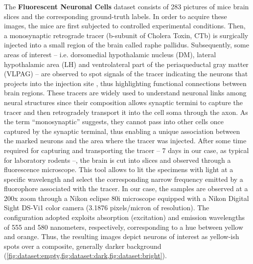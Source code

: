 The \textbf{Fluorescent Neuronal Cells} dataset \cite{clissa2021fluocells} consists of 283 
pictures 
of mice brain slices and the corresponding ground-truth labels.
In order to acquire these images, the mice are first subjected to controlled experimental conditions. Then, a monosynaptic retrograde tracer (b-subunit of Cholera Toxin, CTb) is surgically injected into a small region of the brain called raphe pallidus.
Subsequently, some areas of interest -- i.e. dorsomedial hypothalamic nucleus (DM), lateral hypothalamic area (LH) and ventrolateral part of the periaqueductal gray matter (VLPAG) -- are observed to spot signals of the tracer indicating the neurons that projects into the injection site \cite{hitrec2019neural}, thus highlighting functional connections between brain regions.
These tracers are widely used to understand neuronal links among neural structures since their composition allows synaptic termini to capture the tracer and then retrogradely transport it into the cell soma through the axon. As the term ``monosynaptic'' suggests, they cannot pass into other cells once captured by the synaptic terminal, thus enabling a unique association between the marked neurons and the area where the tracer was injected. 
After some time required for capturing and transporting the tracer -- 7 days in our case, as typical for laboratory rodents --, the brain is cut into slices and observed through a fluorescence microscope.
This tool allows to lit the specimens with light at a specific wavelength and select the corresponding narrow frequency emitted by a fluorophore %
associated with the tracer. 
In our case, the samples are observed at a 200x zoom through a Nikon eclipse 80i microscope equipped with a Nikon Digital Sight DS-Vi1 color camera (3.1876 pixels/micron of resolution).
The configuration adopted exploits absorption (excitation) and emission wavelengths of 555 and 580 nanometers, respectively, corresponding to a hue between yellow and orange.
Thus, the resulting images depict neurons of interest as
yellow-ish spots
over a composite, generally darker background
(\cref{fig:dataset:empty,fig:dataset:dark,fig:dataset:bright}).


